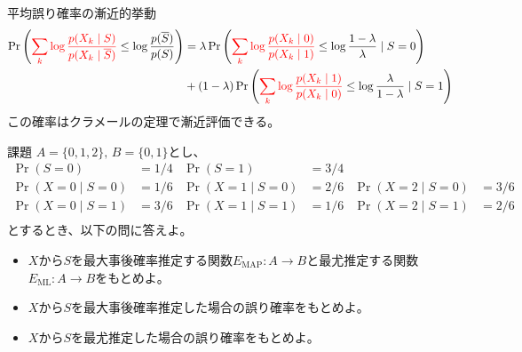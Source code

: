 \documentclass[lualatex,handout]{beamer}
\newcommand{\mycolor}[2]{%
  \begingroup
  \colorlet{currentcolor}{.}%
  \color{#1}#2%
  \color{currentcolor}%
  \endgroup
}
\newcommand{\emm}[1]{\mycolor{red}{#1}}
\theoremstyle{definition}
\begin{document}
\begin{frame}{平均誤り確率の漸近的挙動}
\footnotesize
\begin{align*}
\Pr\left(\emm{\sum_k \log\frac{p(X_k\mid S)}{p(X_k\mid \overline{S})}} \le \log\frac{p(\overline{S})}{p(S)}\right)
&=
\lambda \Pr\left(\emm{\sum_k \log\frac{p(X_k\mid 0)}{p(X_k\mid 1)}} \le \log\frac{1-\lambda}{\lambda}\mid S=0\right)\\
&+
(1-\lambda) \Pr\left(\emm{\sum_k \log\frac{p(X_k\mid 1)}{p(X_k\mid 0)}} \le \log\frac{\lambda}{1-\lambda}\mid S=1\right)
\end{align*}
この確率はクラメールの定理で漸近評価できる。


\end{frame}

\begin{frame}{課題}
\small
$A=\{0,1,2\},\,B=\{0, 1\}$とし、
\begin{align*}
\Pr(S = 0) &= 1/4&
\Pr(S = 1) &= 3/4\\
\Pr(X=0\mid S=0) &= 1/6&
\Pr(X=1\mid S=0) &= 2/6&
\Pr(X=2\mid S=0) &= 3/6\\
\Pr(X=0\mid S=1) &= 3/6&
\Pr(X=1\mid S=1) &= 1/6&
\Pr(X=2\mid S=1) &= 2/6\\
\end{align*}
とするとき、以下の問に答えよ。
\vspace{1em}
\begin{itemize}
\setlength{\itemsep}{1em}
\item $X$から$S$を最大事後確率推定する関数$E_{\mathrm{MAP}}\colon A\to B$と最尤推定する関数$E_{\mathrm{ML}}\colon A\to B$をもとめよ。
\item $X$から$S$を最大事後確率推定した場合の誤り確率をもとめよ。
\item $X$から$S$を最尤推定した場合の誤り確率をもとめよ。
\end{itemize}
\end{frame}
\end{document}
